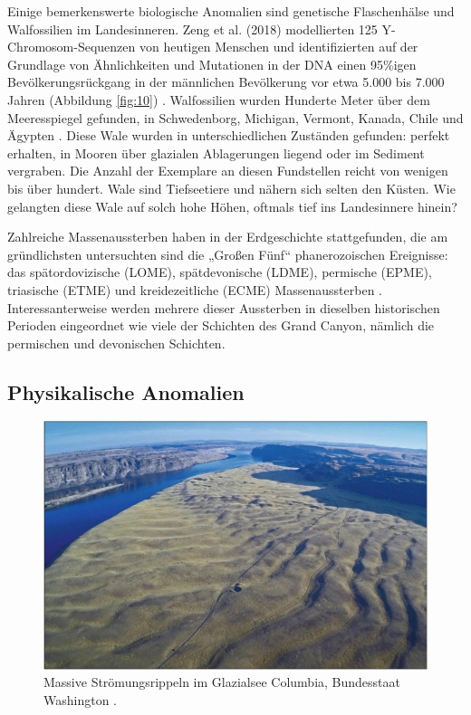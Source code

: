 \documentclass[10pt,twocolumn,letterpaper]{article}
\begin{document}
Einige bemerkenswerte biologische Anomalien sind genetische Flaschenhälse und Walfossilien im Landesinneren. Zeng et al. (2018) modellierten 125 Y-Chromosom-Sequenzen von heutigen Menschen und identifizierten auf der Grundlage von Ähnlichkeiten und Mutationen in der DNA einen 95\%igen Bevölkerungsrückgang in der männlichen Bevölkerung vor etwa 5.000 bis 7.000 Jahren (Abbildung \ref{fig:10}) \cite{62}. Walfossilien wurden Hunderte Meter über dem Meeresspiegel gefunden, in Schwedenborg, Michigan, Vermont, Kanada, Chile und Ägypten \cite{63,64,65,66}. Diese Wale wurden in unterschiedlichen Zuständen gefunden: perfekt erhalten, in Mooren über glazialen Ablagerungen liegend oder im Sediment vergraben. Die Anzahl der Exemplare an diesen Fundstellen reicht von wenigen bis über hundert. Wale sind Tiefseetiere und nähern sich selten den Küsten. Wie gelangten diese Wale auf solch hohe Höhen, oftmals tief ins Landesinnere hinein?

Zahlreiche Massenaussterben haben in der Erdgeschichte stattgefunden, die am gründlichsten untersuchten sind die „Großen Fünf“ phanerozoischen Ereignisse: das spätordovizische (LOME), spätdevonische (LDME), permische (EPME), triasische (ETME) und kreidezeitliche (ECME) Massenaussterben \cite{88,89}. Interessanterweise werden mehrere dieser Aussterben in dieselben historischen Perioden eingeordnet wie viele der Schichten des Grand Canyon, nämlich die permischen und devonischen Schichten.

\subsection{Physikalische Anomalien}

\begin{figure}[b]
\begin{center}
   \includegraphics[width=1\linewidth]{columbia.jpg}
\end{center}
   \caption{Massive Strömungsrippeln im Glazialsee Columbia, Bundesstaat Washington \cite{80}.}
\label{fig:11}
\label{fig:onecol}
\end{figure}
\end{document}
